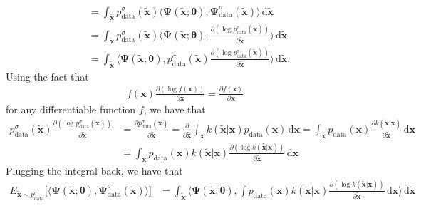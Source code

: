 \documentclass[10pt]{article}
\newcommand{\dee}{\mathrm{d}}
\newcommand{\ve}[1]{\mathbf{#1}}
\newcommand{\mrm}[1]{\mathrm{#1}}
\newcommand{\ves}[1]{\boldsymbol{#1}}
\begin{document}
\begin{itemize}
\begin{align*}
    &= \int_{\widetilde{\ve{x}}} p^\sigma_{\mrm{data}}(\widetilde{\ve{x}}) \big\langle \ves{\Psi}(\widetilde{\ve{x}};\ves{\theta}), \ves{\Psi}^\sigma_{\mrm{data}}(\widetilde{\ve{x}}) \big\rangle\, \dee\widetilde{\ve{x}} \\
    &= \int_{\widetilde{\ve{x}}} p^\sigma_{\mrm{data}}(\widetilde{\ve{x}}) \bigg\langle \ves{\Psi}(\widetilde{\ve{x}};\ves{\theta}), \frac{\partial(\log p^\sigma_{\mrm{data}}(\widetilde{\ve{x}})) }{\partial 
    \widetilde{\ve{x}}} \bigg\rangle\, \dee\widetilde{\ve{x}} \\
    &= \int_{\widetilde{\ve{x}}} \bigg\langle \ves{\Psi}(\widetilde{\ve{x}};\ves{\theta}), p^\sigma_{\mrm{data}}(\widetilde{\ve{x}}) \frac{\partial (\log p^\sigma_{\mrm{data}}(\widetilde{\ve{x}})) }{\partial \widetilde{\ve{x}}} \bigg\rangle\, \dee\widetilde{\ve{x}}.
  \end{align*}
  Using the fact that
  \begin{align*}
    f(\ve{x}) \frac{\partial(\log f(\ve{x}))}{\partial \ve{x}} = \frac{\partial f(\ve{x})}{\partial \ve{x}}
  \end{align*}
  for any differentiable function $f$, we have that
  \begin{align*}
    p^\sigma_{\mrm{data}}(\widetilde{\ve{x}}) \frac{\partial (\log p^\sigma_{\mrm{data}}(\widetilde{\ve{x}})) }{\partial \widetilde{\ve{x}}} 
    &= \frac{\partial p^\sigma_{\mrm{data}}(\widetilde{\ve{x}}) }{\partial \widetilde{\ve{x}}} 
    = \frac{\partial }{\partial 
    \widetilde{\ve{x}}} \int_{\ve{x}} k(\widetilde{\ve{x}}|\ve{x}) p_{\mrm{data}}(\ve{x}) \,\dee\ve{x}
    = \int_{\ve{x}} p_{\mrm{data}}(\ve{x}) \frac{\partial k(\widetilde{\ve{x}}|\ve{x}) }{\partial \widetilde{\ve{x}}} \,\dee\ve{x} \\
    &= \int_{\ve{x}} p_{\mrm{data}}(\ve{x}) k(\widetilde{\ve{x}}|\ve{x}) \frac{\partial (\log k(\widetilde{\ve{x}}|\ve{x})) }{\partial \widetilde{\ve{x}}} \,\dee\ve{x}
  \end{align*}
  Plugging the integral back, we have that
  \begin{align*}
    E_{\widetilde{\ve{x}} \sim p^\sigma_{\mrm{data}}}\Big[ \big\langle \ves{\Psi}(\widetilde{\ve{x}};\ves{\theta}), \ves{\Psi}^\sigma_{\mrm{data}}(\widetilde{\ve{x}}) \big\rangle \Big]    
    &= \int_{\widetilde{\ve{x}}} \bigg\langle \ves{\Psi}(\widetilde{\ve{x}};\ves{\theta}), \int p_{\mrm{data}}(\ve{x}) k(\widetilde{\ve{x}}|\ve{x}) \frac{\partial (\log k(\widetilde{\ve{x}}|\ve{x})) }{\partial \widetilde{\ve{x}}} \,\dee\ve{x} \bigg\rangle\, \dee\widetilde{\ve{x}} \\

\end{align*}
\end{itemize}
\end{document}
